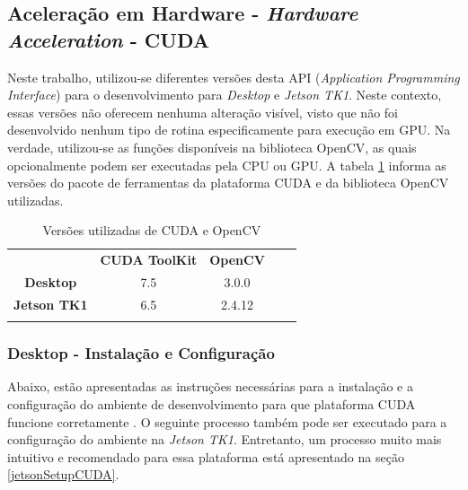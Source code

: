 \subsection{Aceleração em Hardware - \textit{Hardware Acceleration} - CUDA}

Neste trabalho, utilizou-se diferentes versões desta API (\textit{Application Programming Interface}) para o desenvolvimento para \textit{Desktop} e \textit{Jetson TK1}. Neste contexto, essas versões não oferecem nenhuma alteração visível, visto que não foi desenvolvido nenhum tipo de rotina especificamente para execução em GPU. Na verdade, utilizou-se as funções disponíveis na biblioteca OpenCV, as quais opcionalmente podem ser executadas pela CPU ou GPU. A tabela \ref{cudaopencv} informa as versões do pacote de ferramentas da plataforma CUDA e da biblioteca OpenCV utilizadas. 

\begin{table}[]
\centering
\caption{Versões utilizadas de CUDA e OpenCV}
\label{cudaopencv}
\begin{tabular}{cccll}
                     & \textbf{CUDA ToolKit}	     & \textbf{OpenCV} 	       &  &  \\
\textbf{Desktop}     & 7.5                           & 3.0.0                   &  &  \\
\textbf{Jetson TK1}  & 6.5                           & 2.4.12                  &  &  \\
\multicolumn{1}{l}{} & \multicolumn{1}{l}{}          & \multicolumn{1}{l}{}    &  & 
\end{tabular}
\end{table}

\subsubsection{Desktop - Instalação e Configuração}
Abaixo, estão apresentadas as instruções necessárias para a instalação e a configuração do ambiente de desenvolvimento para que plataforma CUDA funcione corretamente \cite{FacebookCUDA}. O seguinte processo também pode ser executado para a configuração do ambiente na \textit{Jetson TK1}. Entretanto, um processo muito mais intuitivo e recomendado para essa plataforma está apresentado na seção \ref{jetsonSetupCUDA}.


